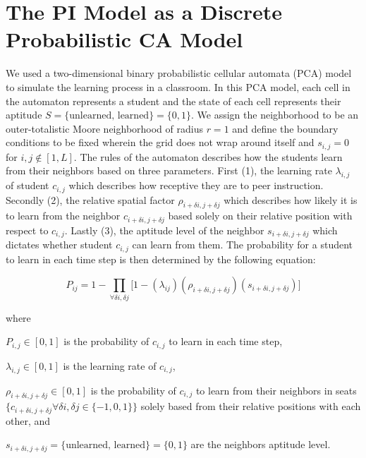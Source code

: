 \section{The PI Model as a Discrete Probabilistic CA Model}

We used a two-dimensional binary probabilistic cellular automata (PCA) model to simulate the learning process in a classroom. In this PCA model, each cell in the automaton represents a student and the state of each cell represents their aptitude $S=\lbrace\text{unlearned, learned}\rbrace=\lbrace 0,1 \rbrace$. We assign the neighborhood to be an outer-totalistic Moore neighborhood of radius $r=1$ and define the boundary conditions to be fixed wherein the grid does not wrap around itself and $s_{i,j} = 0$ for ${i,j \notin [1,L]}$. The rules of the automaton describes how the students learn from their neighbors based on three parameters. First (1), the learning rate $\lambda_{i,j}$ of student $c_{i,j}$ which describes how receptive they are to peer instruction. Secondly (2), the relative spatial factor $\rho_{i+\delta i, j+\delta j}$ which describes how likely it is to learn from the neighbor $c_{i+\delta i, j+\delta j}$ based solely on their relative position with respect to $c_{i,j}$. Lastly (3), the aptitude level of the neighbor $s_{i+\delta i, j+\delta j}$ which dictates whether student $c_{i,j}$ can learn from them. The probability for a student to learn in each time step is then determined by the following equation:

\begin{equation}
    \label{eq:BPCA PI learning probability}
        P_{ij} = 1 - \prod_{\forall \delta i, \delta j}{\lbrack1-(\lambda_{ij})(\rho_{i+\delta i, j+\delta j})(s_{i+\delta i, j+\delta j})}\rbrack
\end{equation}

where

$P_{i,j} \in [0,1]$ is the probability of $c_{i,j}$ to learn in each time step, 

$\lambda_{i,j} \in [0,1]$ is the learning rate of $c_{i,j}$, 

$\rho_{i+\delta i, j+\delta j} \in [0,1]$ is the probability of $c_{i,j}$ to learn from their neighbors in seats $\lbrace c_{i+\delta i, j+\delta j} \forall \delta i, \delta j \in \lbrace -1,0,1 \rbrace \rbrace$ solely based from their relative positions with each other, and

$s_{i+\delta i, j+\delta j} = \lbrace\text{unlearned, learned}\rbrace=\lbrace 0,1 \rbrace$ are the neighbors aptitude level.

